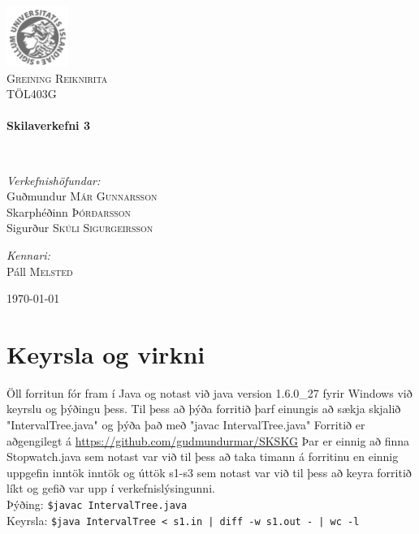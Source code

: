 \documentclass{article}
\begin{document}
\begin {titlepage}
\begin{center}
\includegraphics[width=0.15\textwidth]{./Haskoli_Islands_rett.jpg}~\\[1cm]

\textsc{\LARGE Greining Reiknirita}\\[1.5cm]

\textsc{\Large TÖL403G}\\[0.5cm]

\HRule \\[0.4cm]
{ \huge \bfseries Skilaverkefni 3\\[0.4cm] }

\HRule \\[1.5cm]

\begin{minipage}{0.5\textwidth}
\begin{flushleft} \large
\emph{Verkefnishöfundar:}
\\ Guðmundur\textsc{ Már Gunnarsson }
\\ Skarphéðinn \textsc{Þórðarsson}
\\ Sigurður \textsc{Skúli Sigurgeirsson}

\end{flushleft}
\end{minipage}
\begin{minipage}{0.4\textwidth}
\begin{flushright} \large
\emph{Kennari:} \\
Páll \textsc{Melsted}
\end{flushright}
\end{minipage}

\vfill

{\large \today}

\end{center}

\end{titlepage}

\section {Keyrsla og virkni}
Öll forritun fór fram í Java og notast við java version 1.6.0\_27 fyrir Windows við keyrslu og þýðingu þess. 
Til þess að þýða forritið þarf einungis að sækja skjalið "IntervalTree.java" og þýða það með "javac IntervalTree.java"
Forritið er aðgengilegt á \url{https://github.com/gudmundurmar/SKSKG}
Þar er einnig að finna Stopwatch.java sem notast var við til þess að taka timann á forritinu en einnig uppgefin inntök inntök og úttök s1-s3 sem notast var við til þess að keyra forritið líkt og gefið var upp í verkefnislýsingunni. 
\\ 	Þýðing: \texttt {\$javac IntervalTree.java}
\\ 	Keyrsla: \texttt {\$java IntervalTree < s1.in | diff -w s1.out - | wc -l}
\end{document}
